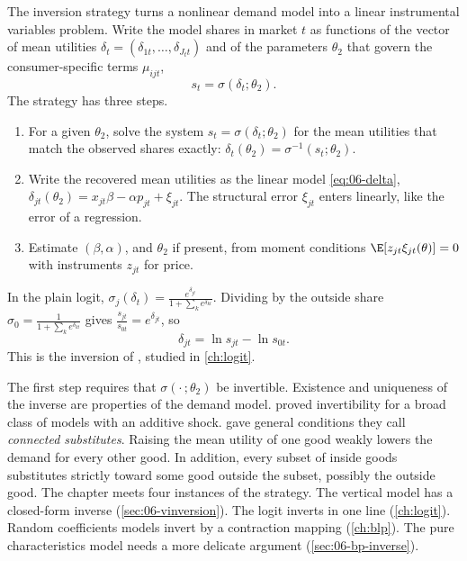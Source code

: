 The inversion strategy turns a nonlinear demand model into a linear instrumental variables problem. Write the
model shares in market $t$ as functions of the vector of mean utilities $\delta_t = (\delta_{1t}, \dots, \delta_{J_t t})$
and of the parameters $\theta_2$ that govern the consumer-specific terms $\mu_{ijt}$,
\begin{equation}\label{eq:06-sigma}
s_t = \sigma(\delta_t; \theta_2).
\end{equation}
The strategy has three steps.
\begin{enumerate}
  \item For a given $\theta_2$, solve the system $s_t = \sigma(\delta_t; \theta_2)$ for the mean utilities that
  match the observed shares exactly: $\delta_t(\theta_2) = \sigma^{-1}(s_t; \theta_2)$.
  \item Write the recovered mean utilities as the linear model \eqref{eq:06-delta},
  $\delta_{jt}(\theta_2) = x_{jt}\beta - \alpha p_{jt} + \xi_{jt}$. The structural error $\xi_{jt}$ enters
  linearly, like the error of a regression.
  \item Estimate $(\beta, \alpha)$, and $\theta_2$ if present, from moment conditions
  $\E[z_{jt}\xi_{jt}(\theta)] = 0$ with instruments $z_{jt}$ for price.
\end{enumerate}
In the plain logit, $\sigma_j(\delta_t) = \frac{e^{\delta_{jt}}}{1 + \sum_k e^{\delta_{kt}}}$. Dividing by the outside share
$\sigma_0 = \frac{1}{1 + \sum_k e^{\delta_{kt}}}$ gives $\frac{s_{jt}}{s_{0t}} = e^{\delta_{jt}}$, so
\begin{equation*}
\delta_{jt} = \ln s_{jt} - \ln s_{0t} .
\end{equation*}
This is the inversion of \citet{Berry1994}, studied in \cref{ch:logit}.

The first step requires that $\sigma(\cdot\,; \theta_2)$ be invertible. Existence and uniqueness of the inverse
are properties of the demand model. \citet{Berry1994} proved invertibility for a broad class of models with
an additive shock. \citet{BerryGandhiHaile2013} gave general conditions they call \emph{connected substitutes}.
Raising the mean utility of one good weakly lowers the demand for every other good. In addition, every subset
of inside goods substitutes strictly toward some good outside the subset, possibly the outside good. The
chapter meets four instances of the strategy. The vertical model has a closed-form inverse
(\cref{sec:06-vinversion}). The logit inverts in one line (\cref{ch:logit}). Random coefficients models invert by
a contraction mapping (\cref{ch:blp}). The pure characteristics model needs a more delicate argument
(\cref{sec:06-bp-inverse}).

